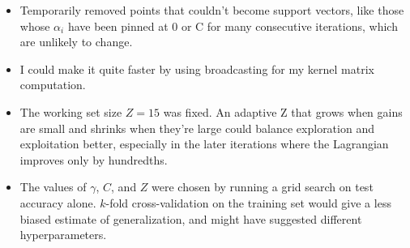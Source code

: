 \documentclass[11pt]{article}
\theoremstyle{mystyle}
\begin{document}
\begin{itemize}
\item Temporarily removed points that couldn't become support vectors, like those whose $\alpha_i$ have been pinned at 0 or C for many consecutive iterations, which are unlikely to change. 
\item I could make it quite faster by using broadcasting for my kernel matrix computation.
\item The working set size $Z=15$ was fixed. An adaptive Z that grows when gains are small and shrinks when they're large could balance exploration and exploitation better, especially in the later iterations where the Lagrangian improves only by hundredths.
\item  The values of $\gamma$, $C$, and $Z$ were chosen by running a grid search on test accuracy alone. $k$-fold cross-validation on the training set would give a less biased estimate of generalization, and might have suggested different hyperparameters.
\end{itemize}
\end{document}
